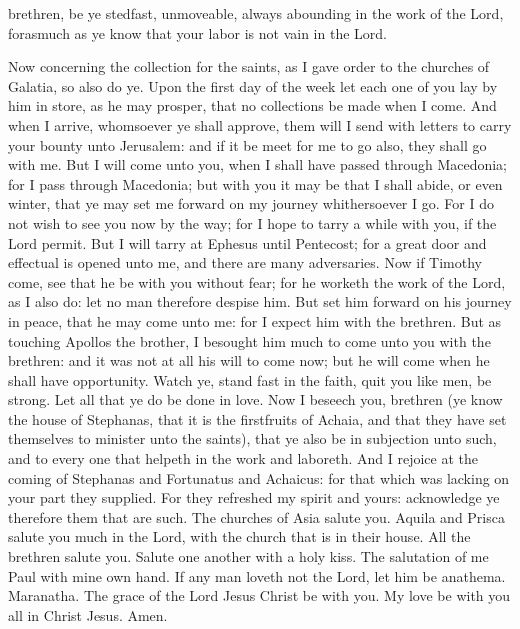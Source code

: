 brethren, be ye stedfast, unmoveable, always abounding in the work of the Lord, forasmuch as ye know that your labor is not vain in the Lord. 

Now concerning the collection for the saints, as I gave order to the churches of Galatia, so also do ye. Upon the first day of the week let each one of you lay by him in store, as he may prosper, that no collections be made when I come. And when I arrive, whomsoever ye shall approve, them will I send with letters to carry your bounty unto Jerusalem: and if it be meet for me to go also, they shall go with me. But I will come unto you, when I shall have passed through Macedonia; for I pass through Macedonia; but with you it may be that I shall abide, or even winter, that ye may set me forward on my journey whithersoever I go. For I do not wish to see you now by the way; for I hope to tarry a while with you, if the Lord permit. But I will tarry at Ephesus until Pentecost; for a great door and effectual is opened unto me, and there are many adversaries.  Now if Timothy come, see that he be with you without fear; for he worketh the work of the Lord, as I also do: let no man therefore despise him. But set him forward on his journey in peace, that he may come unto me: for I expect him with the brethren. But as touching Apollos the brother, I besought him much to come unto you with the brethren: and it was not at all his will to come now; but he will come when he shall have opportunity.  Watch ye, stand fast in the faith, quit you like men, be strong. Let all that ye do be done in love.  Now I beseech you, brethren (ye know the house of Stephanas, that it is the firstfruits of Achaia, and that they have set themselves to minister unto the saints), that ye also be in subjection unto such, and to every one that helpeth in the work and laboreth. And I rejoice at the coming of Stephanas and Fortunatus and Achaicus: for that which was lacking on your part they supplied. For they refreshed my spirit and yours: acknowledge ye therefore them that are such.  The churches of Asia salute you. Aquila and Prisca salute you much in the Lord, with the church that is in their house. All the brethren salute you. Salute one another with a holy kiss.  The salutation of me Paul with mine own hand. If any man loveth not the Lord, let him be anathema. Maranatha. The grace of the Lord Jesus Christ be with you. My love be with you all in Christ Jesus. Amen. 